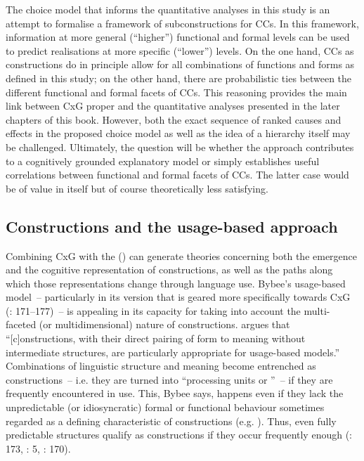   The choice model that informs the quantitative analyses in this study is an attempt to formalise a framework of subconstructions for CCs. In this framework, information at more general (“higher”) functional and formal levels can be used to predict realisations at more specific (“lower”) levels. On the one hand, CCs as constructions do in principle allow for all combinations of functions and forms as defined in this study; on the other hand, there are probabilistic ties between the different functional and formal facets of CCs. This reasoning provides the main link between CxG proper and the quantitative analyses presented in the later chapters of this book. However, both the exact sequence of ranked causes and effects in the proposed choice model as well as the idea of a hierarchy itself may be challenged. Ultimately, the question will be whether the approach contributes to a cognitively grounded explanatory model or simply establishes useful correlations between functional and formal facets of CCs. The latter case would be of value in itself but of course theoretically less satisfying.

\subsection{\label{bkm:Ref485723728}Constructions and the usage-based approach}\label{sec:4.1.2}

Combining CxG with the  (\citealt{Langacker1987,Langacker1988,Bybee2001,Bybee2006,Bybee2010,Bybee2013,Phillips2006}) can generate theories concerning both the emergence and the cognitive representation of constructions, as well as the paths along which those representations change through language use. Bybee’s usage-based model~– particularly in its version that is geared more specifically towards CxG (\citealt{Bybee2013,Bybee2001}: 171–177)~– is appealing in its capacity for taking into account the multi-faceted (or multidimensional) nature of constructions. \citet[51]{Bybee2013} argues that “[c]onstructions, with their direct pairing of form to meaning without intermediate structures, are particularly appropriate for usage-based models.” Combinations of linguistic structure and meaning become entrenched as constructions~– i.e. they are turned into “processing units or ”~– if they are frequently encountered in use. This, Bybee says, happens even if they lack the unpredictable (or idiosyncratic) formal or functional behaviour sometimes regarded as a defining characteristic of constructions (e.g. \citealt{Goldberg2003}). Thus, even fully predictable structures qualify as constructions if they occur frequently enough (\citealt{Bybee2001}: 173, \citealt{Goldberg2006}: 5, \citealt{Trousdale2012}: 170).

